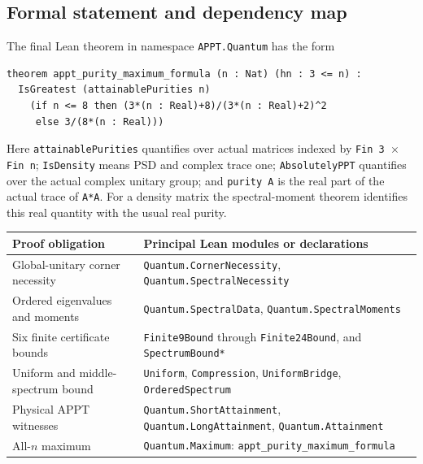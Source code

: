 \documentclass[11pt]{article}
\theoremstyle{remark}\newtheorem{remark}[theorem]{Remark}
\begin{document}
\subsection{Formal statement and dependency map}
The final Lean theorem in namespace \texttt{APPT.Quantum} has the form
\begin{verbatim}
theorem appt_purity_maximum_formula (n : Nat) (hn : 3 <= n) :
  IsGreatest (attainablePurities n)
    (if n <= 8 then (3*(n : Real)+8)/(3*(n : Real)+2)^2
     else 3/(8*(n : Real)))
\end{verbatim}
Here \texttt{attainablePurities} quantifies over actual matrices indexed by \texttt{Fin 3 $\times$ Fin n}; \texttt{IsDensity} means PSD and complex trace one; \texttt{AbsolutelyPPT} quantifies over the actual complex unitary group; and \texttt{purity A} is the real part of the actual trace of \texttt{A*A}. For a density matrix the spectral-moment theorem identifies this real quantity with the usual real purity.

\begin{center}\small
\begin{tabular}{>{\raggedright\arraybackslash}p{}>{\raggedright\arraybackslash}p{}}
\toprule
Proof obligation&Principal Lean modules or declarations\\
\midrule
Global-unitary corner necessity&\texttt{Quantum.CornerNecessity}, \texttt{Quantum.SpectralNecessity}\\
Ordered eigenvalues and moments&\texttt{Quantum.SpectralData}, \texttt{Quantum.SpectralMoments}\\
Six finite certificate bounds&\texttt{Finite9Bound} through \texttt{Finite24Bound}, and \texttt{SpectrumBound*}\\
Uniform and middle-spectrum bound&\texttt{Uniform}, \texttt{Compression}, \texttt{UniformBridge}, \texttt{OrderedSpectrum}\\
Physical APPT witnesses&\texttt{Quantum.ShortAttainment}, \texttt{Quantum.LongAttainment}, \texttt{Quantum.Attainment}\\
All-$n$ maximum&\texttt{Quantum.Maximum}: \texttt{appt\_purity\_maximum\_formula}\\
\bottomrule
\end{tabular}
\end{center}
\end{document}
